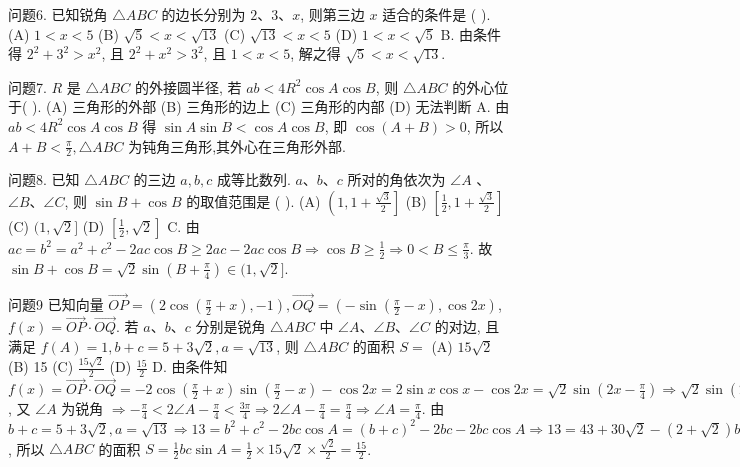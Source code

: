 问题6. 已知锐角 $\triangle A B C$ 的边长分别为 $2 、 3 、 x$, 则第三边 $x$ 适合的条件是 ( ).
(A) $1<x<5$
(B) $\sqrt{5}<x<\sqrt{13}$
(C) $\sqrt{13}<x<5$
(D) $1<x<\sqrt{5}$
B. 由条件得 $2^2+3^2>x^2$, 且 $2^2+x^2>3^2$, 且 $1<x<5$, 解之得 $\sqrt{5}< x<\sqrt{13}$.



问题7. $R$ 是 $\triangle A B C$ 的外接圆半径, 若 $a b<4 R^2 \cos A \cos B$, 则 $\triangle A B C$ 的外心位于( ).
(A) 三角形的外部
(B) 三角形的边上
(C) 三角形的内部
(D) 无法判断
A. 由 $a b<4 R^2 \cos A \cos B$ 得 $\sin A \sin B<\cos A \cos B$, 即 $\cos (A+ B)>0$, 所以 $A+B<\frac{\pi}{2}, \triangle A B C$ 为钝角三角形,其外心在三角形外部.



问题8. 已知 $\triangle A B C$ 的三边 $a, b, c$ 成等比数列.
$a 、 b 、 c$ 所对的角依次为 $\angle A$ 、 $\angle B 、 \angle C$, 则 $\sin B+\cos B$ 的取值范围是 ( ).
(A) $\left(1,1+\frac{\sqrt{3}}{2}\right]$
(B) $\left[\frac{1}{2}, 1+\frac{\sqrt{3}}{2}\right]$
(C) $(1, \sqrt{2}]$
(D) $\left[\frac{1}{2}, \sqrt{2}\right]$
C. 由 $a c=b^2=a^2+c^2-2 a c \cos B \geqslant 2 a c-2 a c \cos B \Rightarrow \cos B \geqslant \frac{1}{2} \Rightarrow 0<B \leqslant \frac{\pi}{3}$. 故 $\sin B+\cos B=\sqrt{2} \sin \left(B+\frac{\pi}{4}\right) \in(1, \sqrt{2}]$.



问题9 已知向量 $\overrightarrow{O P}=\left(2 \cos \left(\frac{\pi}{2}+x\right),-1\right), \overrightarrow{O Q}=\left(-\sin \left(\frac{\pi}{2}-x\right), \cos 2 x\right)$, $f(x)=\overrightarrow{O P} \cdot \overrightarrow{O Q}$. 若 $a 、 b 、 c$ 分别是锐角 $\triangle A B C$ 中 $\angle A 、 \angle B 、 \angle C$ 的对边, 且满足 $f(A)=1, b+c=5+3 \sqrt{2}, a=\sqrt{13}$, 则 $\triangle A B C$ 的面积 $S=$
(A) $15 \sqrt{2}$
(B) 15
(C) $\frac{15 \sqrt{2}}{2}$
(D) $\frac{15}{2}$
D. 由条件知 $f(x)=\overrightarrow{O P} \cdot \overrightarrow{O Q}=-2 \cos \left(\frac{\pi}{2}+x\right) \sin \left(\frac{\pi}{2}-x\right)- \cos 2 x=2 \sin x \cos x-\cos 2 x=\sqrt{2} \sin \left(2 x-\frac{\pi}{4}\right) \Rightarrow \sqrt{2} \sin \left(2 A-\frac{\pi}{4}\right)=1 \Rightarrow \sin \left(2 A-\frac{\pi}{4}\right)=\frac{\sqrt{2}}{2}$, 又 $\angle A$ 为锐角 $\Rightarrow-\frac{\pi}{4}<2 \angle A-\frac{\pi}{4}<\frac{3 \pi}{4} \Rightarrow 2 \angle A-\frac{\pi}{4}= \frac{\pi}{4} \Rightarrow \angle A=\frac{\pi}{4}$. 由 $b+c=5+3 \sqrt{2}, a=\sqrt{13} \Rightarrow 13=b^2+c^2-2 b c \cos A=(b+ c)^2-2 b c-2 b c \cos A \Rightarrow 13=43+30 \sqrt{2}-(2+\sqrt{2}) b c \Rightarrow b c=15 \sqrt{2}$, 所以 $\triangle A B C$ 的面积 $S=\frac{1}{2} b c \sin A=\frac{1}{2} \times 15 \sqrt{2} \times \frac{\sqrt{2}}{2}=\frac{15}{2}$.



